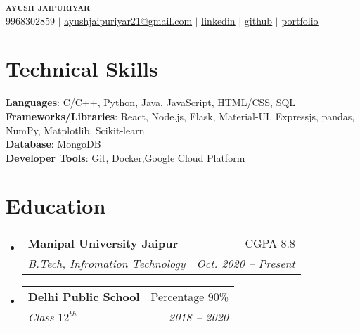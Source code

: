 \documentclass[a4paper,11pt]{article}
\makeatletter
\newcommand{\resumeSubheading}[4]{
    \vspace{-2pt}\item
    \begin{tabular*}{0.97\textwidth}[t]{l@{\extracolsep{\fill}}r}
        \textbf{#1} & #2 \\
        \textit{\small#3} & \textit{\small #4} \\
    \end{tabular*}\vspace{-7pt}
}
\newcommand{\resumeSubHeadingListStart}{\begin{itemize}[leftmargin=0.15in, label={}]}
\newcommand{\resumeSubHeadingListEnd}{\end{itemize}}
\makeatother
\begin{document}

\begin{center}
    \textbf{\Huge \scshape ayush jaipuriyar} \\ \vspace{1pt}
    \small 9968302859 $|$ \href{mailto:ayushjaipuriyar21@gmail.com}{\underline{ayushjaipuriyar21@gmail.com}} $|$
    \href{https://www.linkedin.com/in/ayushjaipuriyar}{\underline{linkedin}} $|$
    \href{https://github.com/ayushjaipuriyar/}{\underline{github}} $|$
    \href{https://portfolio-ayushjaipuriyar.vercel.app/}{\underline{portfolio}}
\end{center}

%
\section{Technical Skills}
\begin{itemize}[leftmargin=0.15in, label={}]
    \small{\item{
                    \textbf{Languages}{: C/C++, Python, Java, JavaScript, HTML/CSS, SQL} \\
                    \textbf{Frameworks/Libraries}{: React, Node.js, Flask, Material-UI, Expressjs, pandas, NumPy, Matplotlib, Scikit‑learn} \\
                    \textbf{Database}{: MongoDB} \\
                    \textbf{Developer Tools}{: Git, Docker,Google Cloud Platform} \\
              }}
\end{itemize}

%

\section{Education}
\resumeSubHeadingListStart
\resumeSubheading
{Manipal University Jaipur}{CGPA 8.8}
{B.Tech, Infromation Technology}{Oct. 2020 -- Present}
\resumeSubheading
{Delhi Public School}{Percentage 90\%}
{Class $12^{th}$}{2018 -- 2020}
\resumeSubHeadingListEnd
\end{document}
